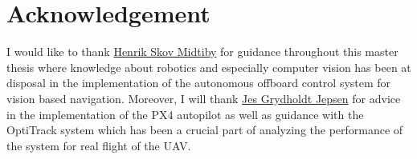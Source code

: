 \documentclass[../Head/report.tex]{subfiles}
\begin{document}
\section*{Acknowledgement}

I would like to thank \href{https://portal.findresearcher.sdu.dk/da/persons/henrik-skov-midtiby}{Henrik Skov Midtiby} for guidance throughout this master thesis where knowledge about robotics and especially computer vision has been at disposal in the implementation of the autonomous offboard control system for vision based navigation. Moreover, I will thank \href{https://portal.findresearcher.sdu.dk/da/persons/jes-grydholdt-jepsen}{Jes Grydholdt Jepsen} for advice in the implementation of the PX4 autopilot as well as guidance with the OptiTrack system which has been a crucial part of analyzing the performance of the system for real flight of the UAV.    
\end{document}

